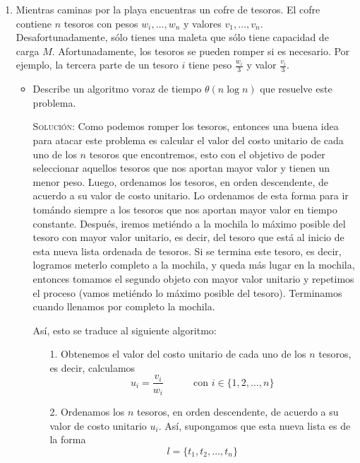 \documentclass[letterpaper,11pt]{article}
\begin{document}
\begin{enumerate}
    \item Mientras caminas por la playa encuentras un cofre de tesoros. El 
    cofre contiene $n$ tesoros con pesos $w_i, \ldots, w_n$ y valores 
    $v_1, \ldots, v_n$. Desafortunadamente, sólo tienes una maleta que sólo 
    tiene capacidad de carga $M$. Afortunadamente, los tesoros se pueden romper
    si es necesario. Por ejemplo, la tercera parte de un tesoro $i$ tiene peso
    $\frac{w_i}{3}$ y valor $\frac{v_i}{3}$.
    \begin{itemize}
        \item Describe un algoritmo voraz de tiempo $\theta(n \log n)$ que 
        resuelve este problema.

        \textsc{Solución:} Como podemos romper los tesoros, entonces una buena 
        idea para atacar este problema es calcular el valor del costo unitario 
        de cada uno de los $n$ tesoros que encontremos, esto con el objetivo 
        de poder seleccionar aquellos tesoros que nos aportan mayor valor y 
        tienen un menor peso. Luego, ordenamos los tesoros, en orden 
        descendente, de acuerdo a su valor de costo unitario. Lo ordenamos de 
        esta forma para ir tomándo siempre a los tesoros que nos aportan 
        mayor valor en tiempo constante. Después, iremos metiéndo a la 
        mochila lo máximo posible del tesoro con mayor valor unitario, es decir, 
        del tesoro que está al inicio de esta nueva lista ordenada de tesoros. 
        Si se termina este tesoro, es decir, logramos meterlo completo a la 
        mochila, y queda más lugar en la mochila, entonces tomamos el segundo 
        objeto con mayor valor unitario y repetimos el proceso (vamos metiéndo 
        lo máximo posible del tesoro). Terminamos cuando llenamos por completo 
        la mochila.

        Así, esto se traduce al siguiente algoritmo:
        \begin{itemize}
            \item[1.] Obtenemos el valor del costo unitario de cada uno de los 
            $n$ tesoros, es decir, calculamos 
            \begin{equation*}
                u_i = \frac{v_i}{w_i} \quad \quad \quad
                \text{con } i \in \{1, 2, \ldots, n\}
            \end{equation*}

            \item[2.] Ordenamos los $n$ tesoros, en orden descendente, de 
            acuerdo a su valor de costo unitario $u_i$. Así, supongamos que 
            esta nueva lista es de la forma 
            \begin{equation*}
                l = \{t_1, t_2, \ldots, t_n\}
            \end{equation*}


\end{itemize}
\end{itemize}
\end{enumerate}
\end{document}

